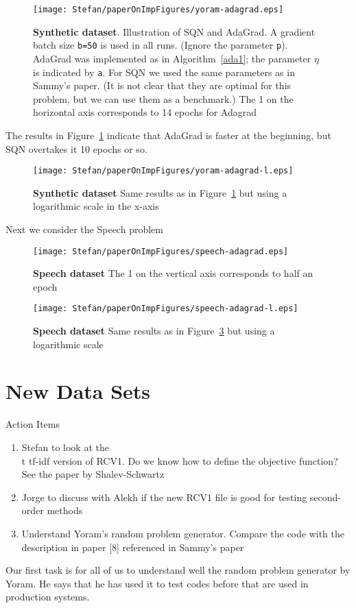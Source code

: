 \documentclass[12pt]{article}
\begin{document}
\begin{figure}[H] 
 \centering
\texttt{[image: Stefan/paperOnImpFigures/yoram-adagrad.eps]}
\caption{{\bf Synthetic dataset}. Illustration of SQN and AdaGrad. A gradient batch size {\tt b=50} is used in all runs. (Ignore the parameter {\tt p}). AdaGrad was implemented as in Algorithm~\ref{ada1}; the parameter $\eta$ is indicated by {\tt a}. For SQN we used the same parameters as in Sammy's paper. (It is not clear that they are optimal for this problem, but we can use them as a benchmark.) The 1 on the horizontal axis corresponds to 14 epochs for Adagrad}
\label{yoram1}
\end{figure}

The results in Figure~\ref{yoram1} indicate that AdaGrad is faster at the beginning, but SQN overtakes it 10 epochs or so. 


\begin{figure}[H] 
 \centering
\texttt{[image: Stefan/paperOnImpFigures/yoram-adagrad-l.eps]}
\caption{{\bf Synthetic dataset} Same results as in Figure~\ref{yoram1} but using a logarithmic scale in the x-axis}
\label{yoram2}
\end{figure}


Next we consider the Speech problem
\begin{figure}[H] 
 \centering
\texttt{[image: Stefan/paperOnImpFigures/speech-adagrad.eps]}
\caption{{\bf Speech dataset} The 1 on the vertical axis corresponds to half an epoch}
\label{speech1}
\end{figure}


\begin{figure}[H] 
 \centering
\texttt{[image: Stefan/paperOnImpFigures/speech-adagrad-l.eps]}
\caption{{\bf Speech dataset} Same results as in Figure~\ref{speech1} but using a logarithmic scale}
\label{speech2}
\end{figure}






\section{New Data Sets}
\label{data}
Action Items
\begin{enumerate}
\item Stefan to look at the {\\t tf-idf } version of RCV1. Do we know how to define the objective function? See the paper by Shalev-Schwartz
\item Jorge to discuss with Alekh if the new RCV1 file is good for testing second-order methods
\item Understand Yoram's random problem generator. Compare the code with the description in paper [8] referenced in Sammy's paper
\end{enumerate}
Our first task is for all of us to understand well the random problem generator by Yoram. He says that he has used it to test codes before that are used in production systems.
\end{document}
